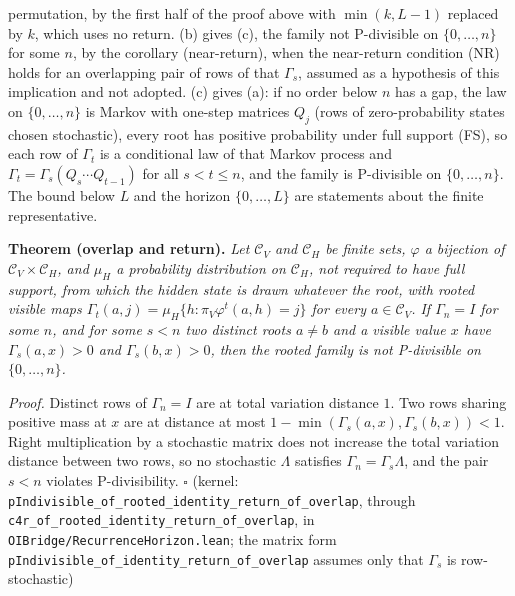 \documentclass[
]{article}
\begin{document}
permutation, by the first half of the proof above with \(\min(k, L-1)\)
replaced by \(k\), which uses no return. (b) gives (c), the family not
P-divisible on \(\{0, \ldots, n\}\) for some \(n\), by the corollary
(near-return), when the near-return condition (NR) holds for an
overlapping pair of rows of that \(\Gamma_s\), assumed as a hypothesis
of this implication and not adopted. (c) gives (a): if no order below
\(n\) has a gap, the law on \(\{0, \ldots, n\}\) is Markov with one-step
matrices \(Q_j\) (rows of zero-probability states chosen stochastic),
every root has positive probability under full support (FS), so each row
of \(\Gamma_t\) is a conditional law of that Markov process and
\(\Gamma_t = \Gamma_s (Q_s \cdots Q_{t-1})\) for all \(s < t \leq n\),
and the family is P-divisible on \(\{0, \ldots, n\}\). The bound below
\(L\) and the horizon \(\{0, \ldots, L\}\) are statements about the
finite representative.

\textbf{Theorem (overlap and return).} \emph{Let \(\mathcal{C}_V\) and
\(\mathcal{C}_H\) be finite sets, \(\varphi\) a bijection of
\(\mathcal{C}_V \times \mathcal{C}_H\), and \(\mu_H\) a probability
distribution on \(\mathcal{C}_H\), not required to have full support,
from which the hidden state is drawn whatever the root, with rooted
visible maps \(\Gamma_t(a, j) = \mu_H\{h : \pi_V \varphi^t(a, h) = j\}\)
for every \(a \in \mathcal{C}_V\). If \(\Gamma_n = I\) for some \(n\),
and for some \(s < n\) two distinct roots \(a \neq b\) and a visible
value \(x\) have \(\Gamma_s(a, x) > 0\) and \(\Gamma_s(b, x) > 0\), then
the rooted family is not P-divisible on \(\{0, \ldots, n\}\).}

\emph{Proof.} Distinct rows of \(\Gamma_n = I\) are at total variation
distance \(1\). Two rows sharing positive mass at \(x\) are at distance
at most \(1 - \min(\Gamma_s(a, x), \Gamma_s(b, x)) < 1\). Right
multiplication by a stochastic matrix does not increase the total
variation distance between two rows, so no stochastic \(\Lambda\)
satisfies \(\Gamma_n = \Gamma_s \Lambda\), and the pair \(s < n\)
violates P-divisibility. \(\square\) (kernel:
\texttt{pIndivisible\_of\_rooted\_identity\_return\_of\_overlap},
through \texttt{c4r\_of\_rooted\_identity\_return\_of\_overlap}, in
\texttt{OIBridge/RecurrenceHorizon.lean}; the matrix form
\texttt{pIndivisible\_of\_identity\_return\_of\_overlap} assumes only
that \(\Gamma_s\) is row-stochastic)
\end{document}
